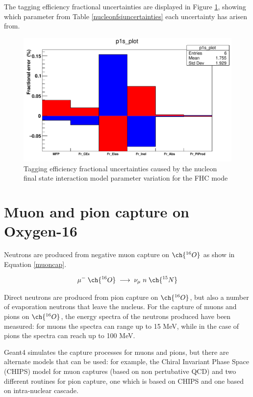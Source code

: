 The tagging efficiency fractional uncertainties are displayed in Figure \ref{fig:nucleonfsiuncertainty}, showing which parameter from Table \ref{nucleonfsiuncertainties} each uncertainty has arisen from.

\begin{figure}
    \includegraphics[scale=0.4]{Figures/nucleonfsi_uncertainty.png}
\caption{Tagging efficiency fractional uncertainties caused by the nucleon final state interaction model parameter variation for the FHC mode}
\label{fig:nucleonfsiuncertainty}
\end{figure}

\section{Muon and pion capture on Oxygen-16}

Neutrons are produced from negative muon capture on $\ch{^{16}O}$ as show in Equation \ref{muoncap}.

\begin{equation}
        \mu^{-}\;\ch{^{16}{O}}\;\longrightarrow\;\nu_{\mu}\;n\;\ch{^{15}{N}}
\label{muoncap}
\end{equation}

Direct neutrons are produced from pion capture on $\ch{^{16}O}$, but also a number of evaporation neutrons that leave the nucleus. For the capture of muons and pions on $\ch{^{16}O}$, the energy spectra of the neutrons produced have been measured: for muons the spectra can range up to 15 MeV, while in the case of pions the spectra can reach up to 100 MeV.


Geant4 simulates the capture processes for muons and pions, but there are alternate models that can be used: for example, the Chiral Invariant Phase Space (CHIPS) model for muon captures (based on non pertubative QCD) and two different routines for pion capture, one which is based on CHIPS and one based on intra-nuclear cascade.

